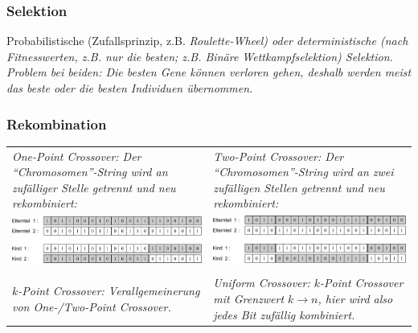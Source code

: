 \subsubsection{Selektion }
  Probabilistische (Zufallsprinzip, z.B. \em Roulette-Wheel\em ) oder deterministische (nach Fitnesswerten, z.B. nur die besten; z.B. \em Binäre Wettkampfselektion\em ) Selektion. Problem bei beiden: Die besten Gene können verloren gehen, deshalb werden meist das beste oder die besten Individuen übernommen.
  
\subsubsection{Rekombination }
  \begin{tabularx}{\textwidth}{p{9cm} p{9cm}}
    \em One-Point Crossover\em : Der "`Chromosomen"'-String wird an zufälliger Stelle getrennt und neu rekombiniert: 
      & \em Two-Point Crossover\em : Der "`Chromosomen"'-String wird an zwei zufälligen Stellen getrennt und neu rekombiniert: \\
    \includegraphics[width=8cm]{./Content/MetaHeuristics/GeneticAlgorithms_OnePointCrossover}
      & \includegraphics[width=8cm]{./Content/MetaHeuristics/GeneticAlgorithms_TwoPointCrossover} \\ \\
    \em $k$-Point Crossover\em : Verallgemeinerung von One-/Two-Point Crossover.
      & \em Uniform Crossover\em : $k$-Point Crossover mit Grenzwert $k \rightarrow n$, hier wird also jedes Bit zufällig kombiniert.
  \end{tabularx}
   
  
